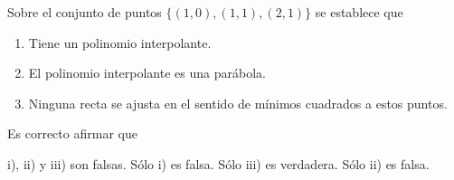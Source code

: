 \begin{pregunta}
\begin{cuerpo}
Sobre el conjunto de puntos
$\{(1,0),(1,1),(2,1)\}$
se establece que 
\begin{enumerate}
	\item[i)] Tiene un polinomio interpolante.
    \item[ii)] El polinomio interpolante es una par\'abola.
    \item[iii)] Ninguna recta se ajusta en el sentido de m\'inimos cuadrados a estos puntos.
\end{enumerate}
Es correcto afirmar que
\
\end{cuerpo}
\begin{multicols}{2}
\begin{alternativas}
 {i), ii) y iii) son falsas.} %
{Sólo i) es falsa.}
{Sólo iii) es verdadera.}
{Sólo ii) es falsa.}
\end{alternativas}
\end{multicols}
\justificacion{0cm}
\end{pregunta}